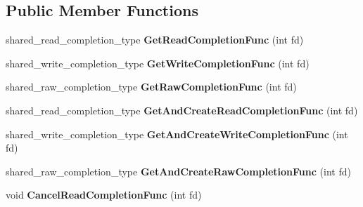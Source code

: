 \subsection*{Public Member Functions}
\begin{DoxyCompactItemize}
\item 
\hypertarget{classlsf_1_1asio_1_1async_1_1CompletionQueue_a611ed3740bb2bc1bcca7e09361d28ab0}{
shared\_\-read\_\-completion\_\-type {\bfseries GetReadCompletionFunc} (int fd)}
\label{classlsf_1_1asio_1_1async_1_1CompletionQueue_a611ed3740bb2bc1bcca7e09361d28ab0}

\item 
\hypertarget{classlsf_1_1asio_1_1async_1_1CompletionQueue_a15925e91e59c9f6031b213359f1fed42}{
shared\_\-write\_\-completion\_\-type {\bfseries GetWriteCompletionFunc} (int fd)}
\label{classlsf_1_1asio_1_1async_1_1CompletionQueue_a15925e91e59c9f6031b213359f1fed42}

\item 
\hypertarget{classlsf_1_1asio_1_1async_1_1CompletionQueue_a82df5f046fa360da1f803f9f4eb1113a}{
shared\_\-raw\_\-completion\_\-type {\bfseries GetRawCompletionFunc} (int fd)}
\label{classlsf_1_1asio_1_1async_1_1CompletionQueue_a82df5f046fa360da1f803f9f4eb1113a}

\item 
\hypertarget{classlsf_1_1asio_1_1async_1_1CompletionQueue_a35f1310ada4f8193bc7c2343ad5199d3}{
shared\_\-read\_\-completion\_\-type {\bfseries GetAndCreateReadCompletionFunc} (int fd)}
\label{classlsf_1_1asio_1_1async_1_1CompletionQueue_a35f1310ada4f8193bc7c2343ad5199d3}

\item 
\hypertarget{classlsf_1_1asio_1_1async_1_1CompletionQueue_ad41fb86976b06cf77c0b90a0f70ad98e}{
shared\_\-write\_\-completion\_\-type {\bfseries GetAndCreateWriteCompletionFunc} (int fd)}
\label{classlsf_1_1asio_1_1async_1_1CompletionQueue_ad41fb86976b06cf77c0b90a0f70ad98e}

\item 
\hypertarget{classlsf_1_1asio_1_1async_1_1CompletionQueue_a23dd34e4d1b5e5ce53a89798d87ffb30}{
shared\_\-raw\_\-completion\_\-type {\bfseries GetAndCreateRawCompletionFunc} (int fd)}
\label{classlsf_1_1asio_1_1async_1_1CompletionQueue_a23dd34e4d1b5e5ce53a89798d87ffb30}

\item 
\hypertarget{classlsf_1_1asio_1_1async_1_1CompletionQueue_a859f8a09efb118f4363723dcd8eeb72b}{
void {\bfseries CancelReadCompletionFunc} (int fd)}
\label{classlsf_1_1asio_1_1async_1_1CompletionQueue_a859f8a09efb118f4363723dcd8eeb72b}


\end{DoxyCompactItemize}
